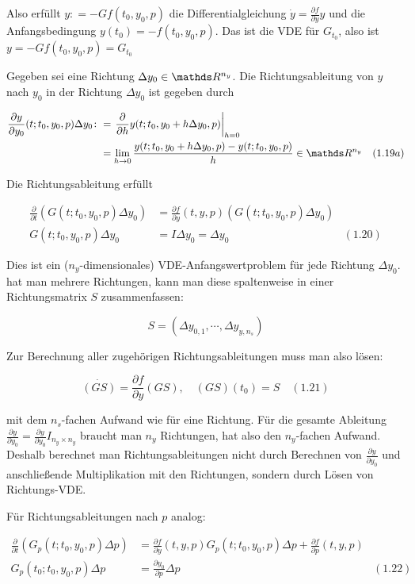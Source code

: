 Also erfüllt $y \colon= -G f(t_0, y_0, p)$ die Differentialgleichung $\dot y = \tfrac{\partial f}{\partial y} y$ und die Anfangsbedingung $y(t_0) = -f(t_0, y_0, p)$. Das ist die VDE für $G_{t_0}$, also ist $y = -G f(t_0, y_0, p) = G_{t_0}$


Gegeben sei eine Richtung $\Delta y_0 \in \R^{n_y}$. Die Richtungsableitung von $y$ nach $y_0$ in der Richtung $\Delta y_0$ ist gegeben durch

\begin{align*}
\frac{\partial y}{\partial y_0} (t; t_0, y_0, p) \Delta y_0 \colon&= \l. \frac \partial{\partial h} y(t; t_0, y_0 + h \Delta y_0, p) \r|_{h=0} \\
&= \lim_{h \to 0} \frac{y(t; t_0, y_0 + h \Delta y_0, p) - y(t; t_0, y_0, p)}{h} \in \R^{n_y} & (1.19a)
\end{align*}

Die Richtungsableitung erfüllt

\begin{align*}
\frac{\partial}{\partial t}(G(t; t_0, y_0, p) \Delta y_0) &= \frac{\partial f}{\partial y} (t,y,p) (G(t;t_0,y_0,p)\Delta y_0) \\
G(t;t_0,y_0,p) \Delta y_0 &= I\Delta y_0 = \Delta y_0 & (1.20)
\end{align*}

Dies ist ein ($n_y$-dimensionales) VDE-Anfangswertproblem für jede Richtung $\Delta y_0$. hat man mehrere Richtungen, kann man diese spaltenweise in einer Richtungsmatrix $S$ zusammenfassen:

\[ S = ( \Delta y_{0,1}, \cdots, \Delta y_{y,n_s}) \]

Zur Berechnung aller zugehörigen Richtungsableitungen muss man also lösen:

\[ \dot{(GS)} = \frac{\partial f}{\partial y} (GS), \quad (GS)(t_0) = S \quad (1.21) \]

mit dem $n_s$-fachen Aufwand wie für eine Richtung. Für die gesamte Ableitung $\frac{\partial y}{\partial y_0} = \frac{\partial y}{\partial y_0} I_{n_y \times n_y}$ braucht man $n_y$ Richtungen, hat also den $n_y$-fachen Aufwand. Deshalb berechnet man Richtungsableitungen nicht durch Berechnen von $\frac{\partial y}{\partial y_0}$ und anschließende Multiplikation mit den Richtungen, sondern durch Lösen von Richtungs-VDE.

Für Richtungsableitungen nach $p$ analog:

\begin{align*}
\frac \partial{\partial t} (G_p(t;t_0,y_0,p) \Delta p) &= \frac{\partial f}{\partial y} (t,y,p) G_p(t;t_0,y_0,p) \Delta p + \frac{\partial f}{\partial p}(t,y,p) \\
G_p(t_0; t_0, y_0, p) \Delta p &= \frac{\partial y_0}{\partial p} \Delta p & (1.22) 
\end{align*}

